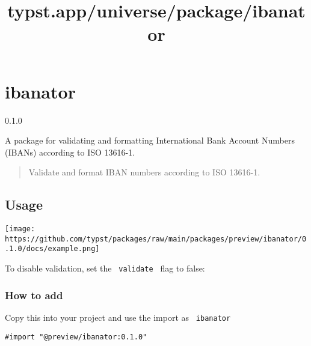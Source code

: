 \title{typst.app/universe/package/ibanator}

\label{banner}
\section{ibanator}\label{ibanator}

{ 0.1.0 }

A package for validating and formatting International Bank Account
Numbers (IBANs) according to ISO 13616-1.

\label{readme}
\begin{quote}
Validate and format IBAN numbers according to ISO 13616-1.
\end{quote}

\subsection{Usage}\label{usage}

\begin{Shaded}
\begin{Highlighting}[]

\end{Highlighting}
\end{Shaded}

\texttt{[image: https://github.com/typst/packages/raw/main/packages/preview/ibanator/0.1.0/docs/example.png]}

To disable validation, set the \texttt{\ validate\ } flag to false:

\begin{Shaded}
\begin{Highlighting}[]
\end{Highlighting}
\end{Shaded}

\subsubsection{How to add}\label{how-to-add}

Copy this into your project and use the import as \texttt{\ ibanator\ }

\begin{verbatim}
#import "@preview/ibanator:0.1.0"
\end{verbatim}

